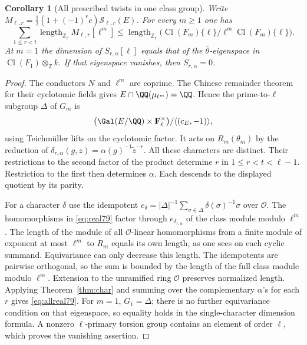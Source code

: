 \documentclass[a4paper,11pt]{article}
\newtheorem{corollary}[proposition]{Corollary}
\theoremstyle{definition}
\theoremstyle{remark}
\newcommand{\ZZ}{\mathbb Z}\newcommand{\ord}{\operatorname{ord}}
\newcommand{\len}{\operatorname{length}}\newcommand{\Res}{\operatorname*{Res}}
\numberwithin{equation}{section}
\newcommand{\Sel}{\mathcal S}
\newcommand{\Cl}{\operatorname{Cl}}
\newcommand{\OO}{\mathcal O}
\begin{document}
\begin{corollary}[All prescribed twists in one class group]
\label{cor:sum79}
Write \(M_{\ell,r}=\tfrac12(1+(-1)^r c)\Sel_{\ell,r}(E)\).
For every \(m\ge1\) one has
\begin{equation}
 \sum_{1\le r<t}\len_{\ZZ_\ell}M_{\ell,r}[\ell^m]
   \le \len_{\ZZ_\ell}\bigl(\Cl(F_m)\{\ell\}/
                                   \ell^m\Cl(F_m)\{\ell\}\bigr).
 \label{eq:allreal79}
\end{equation}
At \(m=1\) the dimension of \(S_{r,\alpha}[\ell]\) equals that of
the \(\bar\theta\)-eigenspace in
\(\Cl(F_1)\otimes_{\ZZ} k\). If that eigenspace vanishes,
then \(S_{r,\alpha}=0\).
\end{corollary}
\begin{proof}
The conductors \(N\) and \(\ell^m\) are coprime. The Chinese
remainder theorem for their cyclotomic fields gives
\(E\cap\QQ(\mu_{\ell^m})=\QQ\). Hence the prime-to-\(\ell\)
subgroup \(\Delta\) of \(G_m\) is
\[
     \bigl(\Gal(E/\QQ)\times\mathbf F_\ell^\times\bigr)/
                                      \langle(c_E,-1)\rangle ,
\]
using Teichm\"uller lifts on the cyclotomic factor. It acts
on \(R_m(\theta_m)\) by the reduction of
\(\delta_{r,\alpha}(g,z)=\alpha(g)^{-1}\widetilde z^{-r}\).
All these characters are distinct. Their restrictions to the
second factor of the product determine \(r\) in
\(1\le r<t<\ell-1\). Restriction to the first then determines
\(\alpha\). Each descends to the displayed quotient by its parity.

For a character \(\delta\) use the idempotent
\(e_\delta=|\Delta|^{-1}\sum_{\sigma\in\Delta}
\delta(\sigma)^{-1}\sigma\) over \(\OO\). The homomorphisms
in \eqref{eq:real79} factor through \(e_{\delta_{r,\alpha}}\)
of the class module modulo \(\ell^m\). The length of the module
of all \(\OO\)-linear homomorphisms from a finite module of
exponent at most \(\ell^m\) to \(R_m\) equals its own length,
as one sees on each cyclic summand. Equivariance can only
decrease this length. The idempotents are pairwise orthogonal,
so the sum is bounded by the length of the full class module
modulo \(\ell^m\). Extension to the unramified ring \(\OO\)
preserves normalized length. Applying Theorem~\ref{thm:char}
and summing over the complementary \(\alpha\)'s for each \(r\)
gives \eqref{eq:allreal79}. For \(m=1\), \(G_1=\Delta\);
there is no further equivariance condition on that eigenspace,
so equality holds in the single-character dimension formula.
A nonzero \(\ell\)-primary torsion group contains an element
of order \(\ell\), which proves the vanishing assertion.
\end{proof}
\end{document}
